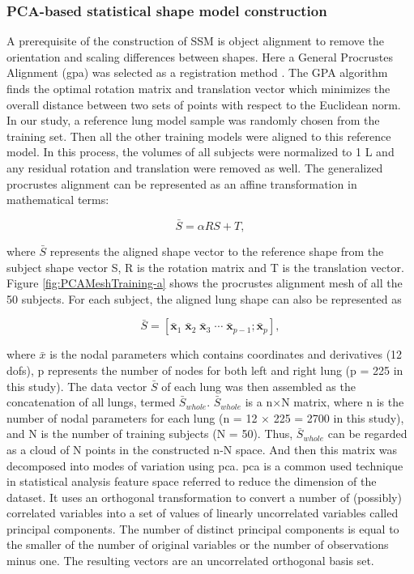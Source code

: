 {%
\subsubsection{PCA-based statistical shape model construction} \label{SSMConstruction}

A prerequisite of the construction of SSM is object alignment to remove the orientation and scaling differences between shapes. Here a General Procrustes Alignment (\gls{gpa}) was selected as a registration method \citep{dryden1998statistical,rohlf1999shape}. The GPA algorithm finds the optimal rotation matrix and translation vector which minimizes the overall distance between two sets of points with respect to the Euclidean norm. In our study, a reference lung model sample was randomly chosen from the training set. Then all the other training models were aligned to this reference model. In this process, the volumes of all subjects were normalized to 1 L and any residual rotation and translation were removed as well. The generalized procrustes alignment can be represented as an affine transformation in mathematical terms:

\begin{equation}
 \label{eq:PCAConstruction1}
 \bar{S} = \alpha RS + T,
\end{equation}

\noindent where $\bar{S}$ represents the aligned shape vector to the reference shape from the subject shape vector S, R is the rotation matrix and T is the translation vector. Figure \ref{fig:PCAMeshTraining-a} shows the procrustes alignment mesh of all the 50 subjects. For each subject, the aligned lung shape can also be represented as 

\begin{equation}
 \label{eq:PCAConstruction2}
 \bar{S} = [\mathbf{\bar{x}}_1 \; \mathbf{\bar{x}}_2 \; \mathbf{\bar{x}}_3 \; \cdots \; \mathbf{\bar{x}}_{p-1}; \mathbf{\bar{x}}_p],
\end{equation}

\noindent where $\bar{x}$ is the nodal parameters which contains coordinates and derivatives (12 \gls{dof}s), p represents the number of nodes for both left and right lung (p = 225 in this study). The data vector $\bar{S}$ of each lung was then assembled as the concatenation of all lungs, termed $\bar{S}_{whole}$. $\bar{S}_{whole}$ is a n$\times$N matrix, where n is the number of nodal parameters for each lung (n = 12 $\times$ 225 = 2700 in this study), and N is the number of training subjects (N = 50). Thus, $\bar{S}_{whole}$ can be regarded as a cloud of N points in the constructed n-N space. And then this matrix was decomposed into modes of variation using \gls{pca}. \gls{pca} is a common used technique in statistical analysis feature space referred to reduce the dimension of the dataset. It uses an orthogonal transformation to convert a number of (possibly) correlated variables into a set of values of linearly uncorrelated variables called principal components. The number of distinct principal components is equal to the smaller of the number of original variables or the number of observations minus one. The resulting vectors are an uncorrelated orthogonal basis set. 

}
